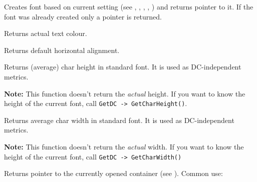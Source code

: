\label{wxhtmlwinparsercreatecurrentfont}


Creates font based on current setting (see 
, 
, 
, 
, 
)
and returns pointer to it.
If the font was already created only a pointer is returned.


\label{wxhtmlwinparsergetactualcolor}


Returns actual text colour.

\label{wxhtmlwinparsergetalign}


Returns default horizontal alignment.

\label{wxhtmlwinparsergetcharheight}


Returns (average) char height in standard font. It is used as DC-independent metrics.

{\bf Note:} This function doesn't return the {\it actual} height. If you want to
know the height of the current font, call {\tt GetDC -> GetCharHeight()}.

\label{wxhtmlwinparsergetcharwidth}


Returns average char width in standard font. It is used as DC-independent metrics.

{\bf Note:} This function doesn't return the {\it actual} width. If you want to
know the height of the current font, call {\tt GetDC -> GetCharWidth()}

\label{wxhtmlwinparsergetcontainer}


Returns pointer to the currently opened container (see ).
Common use:

